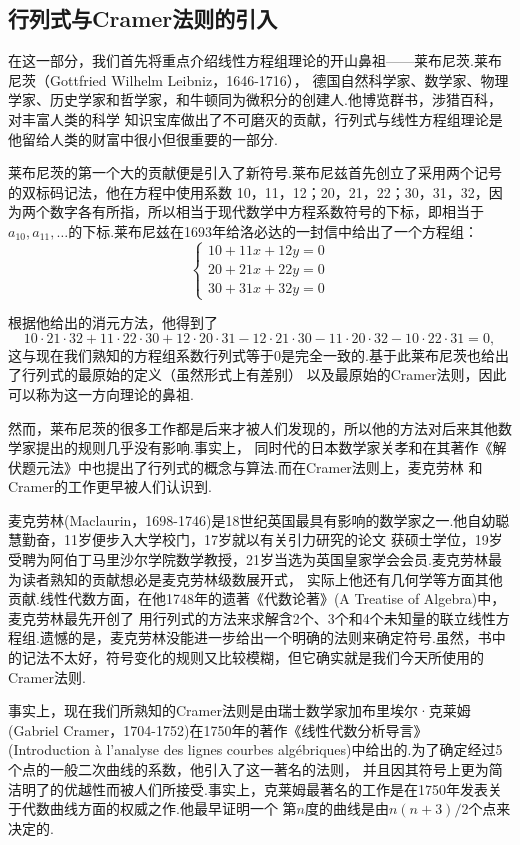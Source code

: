 \documentclass{ctexbook}
\begin{document}
\subsection{行列式与Cramer法则的引入}
在这一部分，我们首先将重点介绍线性方程组理论的开山鼻祖——莱布尼茨.莱布尼茨（Gottfried Wilhelm Leibniz，1646-1716），
德国自然科学家、数学家、物理学家、历史学家和哲学家，和牛顿同为微积分的创建人.他博览群书，涉猎百科，对丰富人类的科学
知识宝库做出了不可磨灭的贡献，行列式与线性方程组理论是他留给人类的财富中很小但很重要的一部分.

莱布尼茨的第一个大的贡献便是引入了新符号.莱布尼兹首先创立了采用两个记号的双标码记法，他在方程中使用系数
10，11，12；20，21，22；30，31，32，因为两个数字各有所指，所以相当于现代数学中方程系数符号的下标，即相当于
$a_{10},a_{11},\ldots$的下标.莱布尼兹在1693年给洛必达的一封信中给出了一个方程组：
\[\begin{cases}
    10+11x+12y=0\\
    20+21x+22y=0\\
    30+31x+32y=0
\end{cases}\]

根据他给出的消元方法，他得到了\[10\cdot 21\cdot 32+11\cdot 22\cdot 30+12\cdot 20\cdot 31-12\cdot 21\cdot 30-11\cdot 20\cdot 32-10\cdot 22\cdot 31=0,\]
这与现在我们熟知的方程组系数行列式等于0是完全一致的.基于此莱布尼茨也给出了行列式的最原始的定义（虽然形式上有差别）
以及最原始的Cramer法则，因此可以称为这一方向理论的鼻祖.

然而，莱布尼茨的很多工作都是后来才被人们发现的，所以他的方法对后来其他数学家提出的规则几乎没有影响.事实上，
同时代的日本数学家关孝和在其著作《解伏题元法》中也提出了行列式的概念与算法.而在Cramer法则上，麦克劳林
和Cramer的工作更早被人们认识到.

麦克劳林(Maclaurin，1698-1746)是18世纪英国最具有影响的数学家之一.他自幼聪慧勤奋，11岁便步入大学校门，17岁就以有关引力研究的论文
获硕士学位，19岁受聘为阿伯丁马里沙尔学院数学教授，21岁当选为英国皇家学会会员.麦克劳林最为读者熟知的贡献想必是麦克劳林级数展开式，
实际上他还有几何学等方面其他贡献.线性代数方面，在他1748年的遗著《代数论著》(A Treatise of Algebra)中，麦克劳林最先开创了
用行列式的方法来求解含2个、3个和4个未知量的联立线性方程组.遗憾的是，麦克劳林没能进一步给出一个明确的法则来确定符号.虽然，书中
的记法不太好，符号变化的规则又比较模糊，但它确实就是我们今天所使用的Cramer法则.

事实上，现在我们所熟知的Cramer法则是由瑞士数学家加布里埃尔·克莱姆(Gabriel Cramer，1704-1752)在1750年的著作《线性代数分析导言》
(Introduction à l'analyse des lignes courbes algébriques)中给出的.为了确定经过5个点的一般二次曲线的系数，他引入了这一著名的法则，
并且因其符号上更为简洁明了的优越性而被人们所接受.事实上，克莱姆最著名的工作是在1750年发表关于代数曲线方面的权威之作.他最早证明一个
第$n$度的曲线是由$n(n + 3)/2$个点来决定的.
\end{document}
